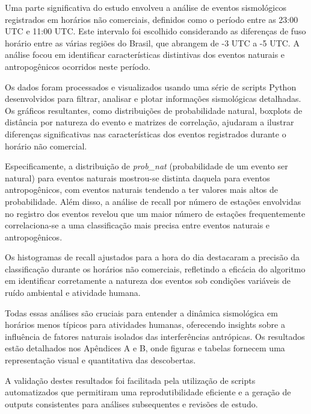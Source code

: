 \par{Uma parte significativa do estudo envolveu a análise de eventos sismológicos registrados em horários não comerciais, definidos como o período entre as 23:00 UTC e 11:00 UTC. Este intervalo foi escolhido considerando as diferenças de fuso horário entre as várias regiões do Brasil, que abrangem de -3 UTC a -5 UTC. A análise focou em identificar características distintivas dos eventos naturais e antropogênicos ocorridos neste período.}

\par{Os dados foram processados e visualizados usando uma série de scripts Python desenvolvidos para filtrar, analisar e plotar informações sismológicas detalhadas. Os gráficos resultantes, como distribuições de probabilidade natural, boxplots de distância por natureza do evento e matrizes de correlação, ajudaram a ilustrar diferenças significativas nas características dos eventos registrados durante o horário não comercial.}

\par{Especificamente, a distribuição de \textit{prob\_nat} (probabilidade de um evento ser natural) para eventos naturais mostrou-se distinta daquela para eventos antropogênicos, com eventos naturais tendendo a ter valores mais altos de probabilidade. Além disso, a análise de recall por número de estações envolvidas no registro dos eventos revelou que um maior número de estações frequentemente correlaciona-se a uma classificação mais precisa entre eventos naturais e antropogênicos.}

\par{Os histogramas de recall ajustados para a hora do dia destacaram a precisão da classificação durante os horários não comerciais, refletindo a eficácia do algoritmo em identificar corretamente a natureza dos eventos sob condições variáveis de ruído ambiental e atividade humana.}

\par{Todas essas análises são cruciais para entender a dinâmica sismológica em horários menos típicos para atividades humanas, oferecendo insights sobre a influência de fatores naturais isolados das interferências antrópicas. Os resultados estão detalhados nos Apêndices A e B, onde figuras e tabelas fornecem uma representação visual e quantitativa das descobertas.}

\par{A validação destes resultados foi facilitada pela utilização de scripts automatizados que permitiram uma reprodutibilidade eficiente e a geração de outputs consistentes para análises subsequentes e revisões de estudo.}

